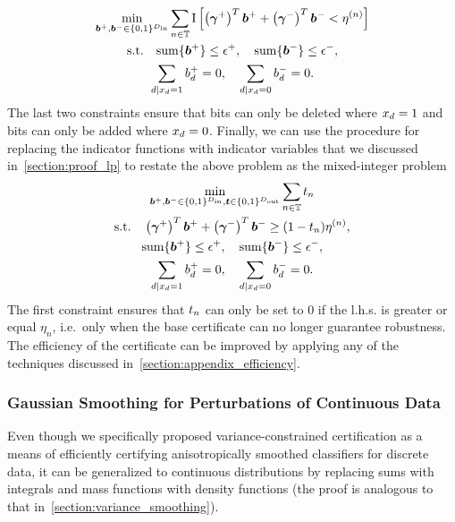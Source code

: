 \begin{gather}
    \min_{{\bm{b}}^{+}, {\bm{b}}^{-} \in \{0,1\}^{D_\mathrm{in}}} \sum_{n \in {\mathbb{T}}} \mathrm{I}\left[
        \left({\bm{\gamma}}^{+}\right)^T {\bm{b}}^+  + 
        \left({\bm{\gamma}}^{-}\right)^T  {\bm{b}}^-
        < \eta^{(n)}
    \right]
    \\
    \text{s.t.}
    \quad
\mathrm{sum}\{{\bm{b}}^+\} \leq \epsilon^{+},
\quad
\mathrm{sum}\{{\bm{b}}^-\} \leq \epsilon^{-},
\\
\sum_{d | {x}_d=1} {b}_d^{+} = 0,
\quad
\sum_{d | {x}_d=0} {b}_d^{-} = 0.
\end{gather}
The last two constraints ensure that bits can only be deleted where ${x}_d = 1$ and bits can only be added where ${x}_d = 0$.
Finally, we can use the procedure for replacing the indicator functions with indicator variables that we discussed in~\autoref{section:proof_lp} to restate the above problem as the mixed-integer problem
\begin{gather}
    \min_{{\bm{b}}^{+}, {\bm{b}}^{-} \in \{0,1\}^{D_\mathrm{in}}, {\bm{t}} \in \{0,1\}^{D_\mathrm{out}}} \sum_{n \in {\mathbb{T}}} {t}_n
    \\
    \text{s.t.}
    \quad
    \left({\bm{\gamma}}^{+}\right)^T {\bm{b}}^+  + 
        \left({\bm{\gamma}}^{-}\right)^T  {\bm{b}}^-
    \geq  (1 - {t}_n) \eta^{(n)}, 
    \\
\mathrm{sum}\{{\bm{b}}^+\} \leq \epsilon^{+},
\quad
\mathrm{sum}\{{\bm{b}}^-\} \leq \epsilon^{-},
\\
\sum_{d | {x}_d=1} {b}_d^{+} = 0,
\quad
\sum_{d | {x}_d=0} {b}_d^{-} = 0.
\end{gather}
The first constraint ensures that ${t}_n$ can only be set to $0$ if the l.h.s. is greater or equal $\eta_n$, i.e.~only when the base certificate can no longer guarantee robustness.
The efficiency of the certificate can be improved by applying any of the techniques discussed in~\autoref{section:appendix_efficiency}.

\subsubsection{Gaussian Smoothing for Perturbations of Continuous Data}\label{section:variance_constrained_gaussian}
Even though we specifically proposed variance-constrained certification as a means of efficiently certifying anisotropically smoothed classifiers for discrete data, it can be generalized to continuous distributions by replacing sums with integrals and mass functions with density functions (the proof is analogous to that in~\cref{section:variance_smoothing}).

